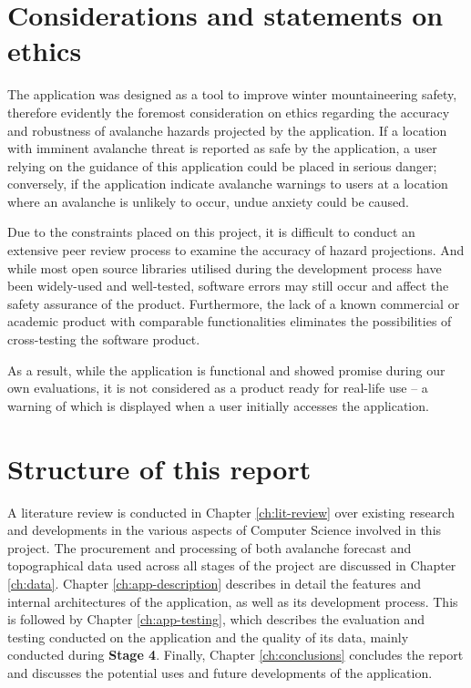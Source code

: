\documentclass[openany]{UoYCSproject}
\begin{document}
\section{Considerations and statements on ethics}

The application was designed as a tool to improve winter mountaineering safety, therefore evidently the foremost consideration on ethics regarding the accuracy and robustness of avalanche hazards projected by the application. If a location with imminent avalanche threat is reported as safe by the application, a user relying on the guidance of this application could be placed in serious danger; conversely, if the application indicate avalanche warnings to users at a location where an avalanche is unlikely to occur, undue anxiety could be caused.

Due to the constraints placed on this project, it is difficult to conduct an extensive peer review process to examine the accuracy of hazard projections. And while most open source libraries utilised during the development process have been widely-used and well-tested, software errors may still occur and affect the safety assurance of the product. Furthermore, the lack of a known commercial or academic product with comparable functionalities eliminates the possibilities of cross-testing the software product.

As a result, while the application is functional and showed promise during our own evaluations, it is not considered as a product ready for real-life use -- a warning of which is displayed when a user initially accesses the application.

\section{Structure of this report}

A literature review is conducted in Chapter \ref{ch:lit-review} over existing research and developments in the various aspects of Computer Science involved in this project. The procurement and processing of both avalanche forecast and topographical data used across all stages of the project are discussed in Chapter \ref{ch:data}. Chapter \ref{ch:app-description} describes in detail the features and internal architectures of the application, as well as its development process. This is followed by Chapter \ref{ch:app-testing}, which describes the evaluation and testing conducted on the application and the quality of its data, mainly conducted during \textbf{Stage 4}. Finally, Chapter \ref{ch:conclusions} concludes the report and discusses the potential uses and future developments of the application.
\end{document}
